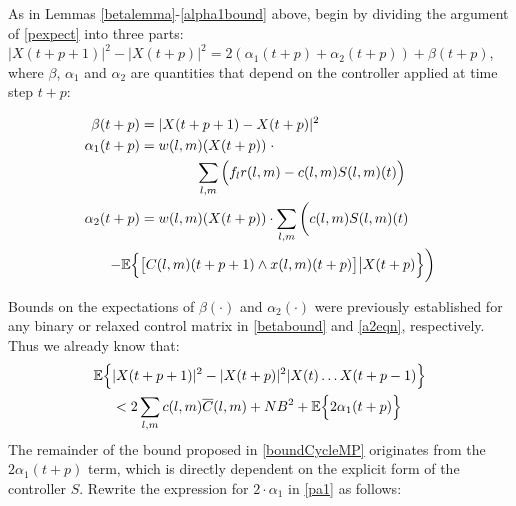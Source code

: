 \begin{IEEEproof}
As in Lemmas \ref{betalemma}-\ref{alpha1bound} above, begin by dividing the argument of \eqref{pexpect} into three parts: $|X(t+ p + 1)|^{2} - |X(t + p)|^{2}  = 2(\alpha_1(t + p)+\alpha_2(t + p)) + \beta(t + p)$, 
where $\beta$, $\alpha_{1}$ and $\alpha_{2}$ are quantities that depend on the controller applied at time step $t + p$:
\begin{small}
\begin{align}
\beta (t+p)  &= \vert X(t + p + 1) - X(t + p) \vert^{2} \label{pbeta} \\
\alpha_{1} (t+p) &= w(l,m)(X(t + p)) \; \cdot \label{pa1} \\  \nonumber
& \qquad \qquad  \sum_{l,m} \Big(f_{l}r(l,m) - c(l,m)S(l,m)(t)\Big)\\ 
 \alpha_{2}  (t+p)&= w(l,m)(X(t + p)) \cdot \sum_{l,m} \bigg(c(l,m)S(l,m)(t) \label{pa2} \\ \nonumber
 - \expectation{ & \big[C(l,m)(t+p + 1)\wedge x(l,m)(t + p)\big] \big| X(t + p) }\bigg)
 \end{align}
 \end{small}Bounds on the expectations of  $\beta(\cdot)$ and $\alpha_2(\cdot)$ were previously established for any binary or relaxed control matrix in \eqref{betabound} and \eqref{a2eqn}, respectively. Thus we already know that:
\begin{align}\nonumber
\expectation{&\vert X(t + p + 1) \vert^2 - \vert X(t + p)\vert^2 \vert X(t) \ldots X(t + p - 1)} \\  \label{cbmpcombined1}
&< 2 \sum_{l,m} c(l,m)\overline{C}(l,m) + N B^2 + \expectation{2\alpha_1(t+p) }
\end{align}
The remainder of the bound proposed in \eqref{boundCycleMP} originates from the $2 \alpha_1 (t+p)$ term, which is directly dependent on the explicit form of the controller $S$. Rewrite the expression for $2\cdot \alpha_1$ in \eqref{pa1} as follows:

\end{IEEEproof}
